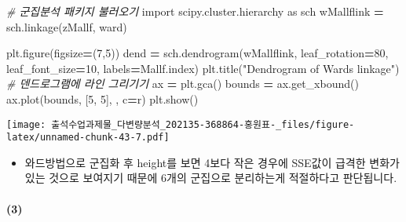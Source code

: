 \documentclass[
]{article}
\newenvironment{Shaded}{\begin{snugshade}}{\end{snugshade}}
\newcommand{\CommentTok}[1]{\textcolor[rgb]{0.56,0.35,0.01}{\textit{#1}}}
\newcommand{\DecValTok}[1]{\textcolor[rgb]{0.00,0.00,0.81}{#1}}
\newcommand{\ImportTok}[1]{#1}
\newcommand{\NormalTok}[1]{#1}
\newcommand{\OperatorTok}[1]{\textcolor[rgb]{0.81,0.36,0.00}{\textbf{#1}}}
\newcommand{\StringTok}[1]{\textcolor[rgb]{0.31,0.60,0.02}{#1}}
\providecommand{\tightlist}{%
  \setlength{\itemsep}{0pt}\setlength{\parskip}{0pt}}
\begin{document}
\begin{Shaded}
\begin{Highlighting}[]
\CommentTok{\# 군집분석 패키지 불러오기}
\ImportTok{import}\NormalTok{ scipy.cluster.hierarchy }\ImportTok{as}\NormalTok{ sch}
\NormalTok{wMallflink }\OperatorTok{=}\NormalTok{ sch.linkage(zMallf, }\StringTok{\textquotesingle{}ward\textquotesingle{}}\NormalTok{)}

\NormalTok{plt.figure(figsize}\OperatorTok{=}\NormalTok{(}\DecValTok{7}\NormalTok{,}\DecValTok{5}\NormalTok{))}
\NormalTok{dend }\OperatorTok{=}\NormalTok{ sch.dendrogram(wMallflink, leaf\_rotation}\OperatorTok{=}\DecValTok{80}\NormalTok{, leaf\_font\_size}\OperatorTok{=}\DecValTok{10}\NormalTok{, labels}\OperatorTok{=}\NormalTok{Mallf.index)}
\NormalTok{plt.title(}\StringTok{"Dendrogram of Ward\textquotesingle{}s linkage"}\NormalTok{)}
\CommentTok{\# 덴드로그램에 라인 그리기기}
\NormalTok{ax }\OperatorTok{=}\NormalTok{ plt.gca() }
\NormalTok{bounds }\OperatorTok{=}\NormalTok{ ax.get\_xbound() }
\NormalTok{ax.plot(bounds, [}\DecValTok{5}\NormalTok{, }\DecValTok{5}\NormalTok{], }\StringTok{\textquotesingle{}{-}{-}\textquotesingle{}}\NormalTok{, c}\OperatorTok{=}\StringTok{\textquotesingle{}r\textquotesingle{}}\NormalTok{)}
\NormalTok{plt.show()}
\end{Highlighting}
\end{Shaded}

\texttt{[image: 출석수업과제물\_다변량분석\_202135-368864-홍원표-\_files/figure-latex/unnamed-chunk-43-7.pdf]}

\begin{itemize}
\tightlist
\item
  와드방법으로 군집화 후 height를 보면 4보다 작은 경우에 SSE값이 급격한
  변화가 있는 것으로 보여지기 때문에 6개의 군집으로 분리하는게
  적절하다고 판단됩니다.
\end{itemize}

\hypertarget{section-22}{%
\paragraph{(3)}\label{section-22}}
\end{document}
